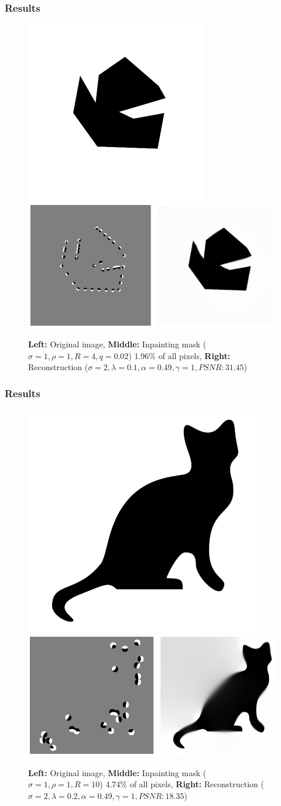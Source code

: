 \documentclass{beamer}
\begin{document}
    \begin{frame}
        \frametitle{Results}
        \begin{figure}[htpb]
            \centering
            \includegraphics[width=0.3\linewidth]{../images/binary/abstract1_small.png}
            \includegraphics[width=0.6\linewidth]{images/abstract.png}
            \caption{ \textbf{Left:} Original image, \textbf{Middle:} Inpainting mask
                ($\sigma=1,\rho=1,R=4,q=0.02$) 1.96\% of all pixels, \textbf{Right:} Reconstruction
            ($\sigma=2,\lambda=0.1,\alpha=0.49,\gamma=1, PSNR: 31.45$) }
        \end{figure}        
    \end{frame}

    \begin{frame}
        \frametitle{Results}
        \begin{figure}[htpb]
            \centering
            \includegraphics[width=0.3\linewidth]{../images/binary/cat.png}
            \includegraphics[width=0.6\linewidth]{images/cat.png}
            \caption{ \textbf{Left:} Original image, \textbf{Middle:} Inpainting mask
                ($\sigma=1,\rho=1,R=10$) 4.74\% of all pixels, \textbf{Right:} Reconstruction
            ($\sigma=2,\lambda=0.2,\alpha=0.49,\gamma=1, PSNR: 18.35$) }
        \end{figure}
    \end{frame}
\end{document}
